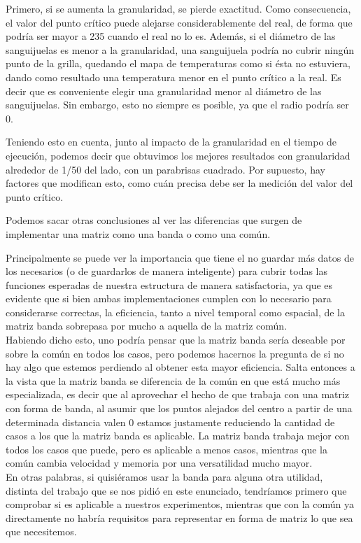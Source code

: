 \documentclass[spanish,a4paper]{article}
\begin{document}
Primero, si se aumenta la granularidad, se pierde exactitud. Como consecuencia, el valor del punto crítico puede alejarse considerablemente del real, de forma que podría ser mayor a 235 cuando el real no lo es. Además, si el diámetro de las sanguijuelas es menor a la granularidad, una sanguijuela podría no cubrir ningún punto de la grilla, quedando el mapa de temperaturas como si ésta no estuviera, dando como resultado una temperatura menor en el punto crítico a la real. Es decir que es conveniente elegir una granularidad menor al diámetro de las sanguijuelas. Sin embargo, esto no siempre es posible, ya que el radio podría ser 0.

Teniendo esto en cuenta, junto al impacto de la granularidad en el tiempo de ejecución, podemos decir que obtuvimos los mejores resultados con granularidad alrededor de 1/50 del lado, con un parabrisas cuadrado. Por supuesto, hay factores que modifican esto, como cuán precisa debe ser la medición del valor del punto crítico.

Podemos sacar otras conclusiones al ver las diferencias que surgen de implementar una matriz como una banda o como una común.

Principalmente se puede ver la importancia que tiene el no guardar más datos de los necesarios (o de guardarlos de manera inteligente) para cubrir todas las funciones esperadas de nuestra estructura de manera satisfactoria, ya que es evidente que si bien ambas implementaciones cumplen con lo necesario para considerarse correctas, la eficiencia, tanto a nivel temporal como espacial, de la matriz banda sobrepasa por mucho a aquella de la matriz común.\\

Habiendo dicho esto, uno podría pensar que la matriz banda sería deseable por sobre la común en todos los casos, pero podemos hacernos la pregunta de si no hay algo que estemos perdiendo al obtener esta mayor eficiencia.  Salta entonces a la vista que la matriz banda se diferencia de la común en que está mucho más especializada, es decir que al aprovechar el hecho de que trabaja con una matriz con forma de banda, al asumir que los puntos alejados del centro a partir de una determinada distancia valen 0 estamos justamente reduciendo la cantidad de casos a los que la matriz banda es aplicable. La matriz banda trabaja mejor con todos los casos que puede, pero es aplicable a menos casos, mientras que la común cambia velocidad y memoria por una versatilidad mucho mayor.\\
En otras palabras, si quisiéramos usar la banda para alguna otra utilidad, distinta del trabajo que se nos pidió en este enunciado, tendríamos primero que comprobar si es aplicable a nuestros experimentos, mientras que con la común ya directamente no habría requisitos para representar en forma de matriz lo que sea que necesitemos.\\
\end{document}
